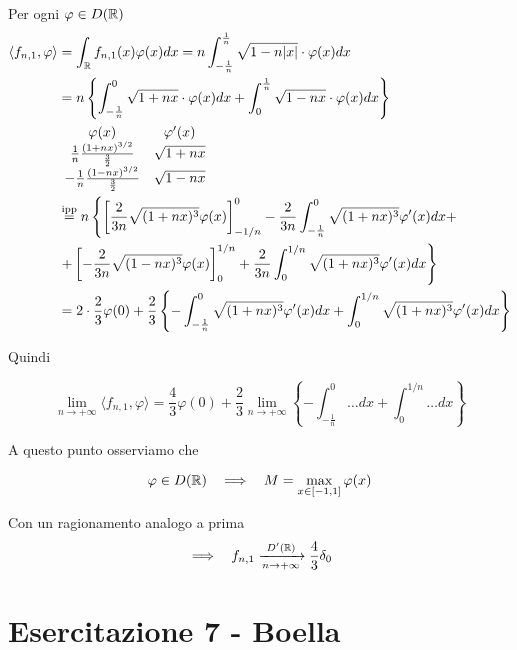 \begin{enumerate}
Per ogni $\varphi \in D(\mathbb{R})$
\begin{align*}
\langle f_{n, 1}, \varphi \rangle & = \int_{\mathbb{R}} f_{n, 1}(x) \varphi (x) dx = n\int^{\frac{1}{n}}_{- \frac{1}{n}}\sqrt{1 - n| x|} \cdot \varphi (x) dx\\
 & = n\left\{\int^{0}_{- \frac{1}{n}}\sqrt{1 + nx} \cdot \varphi (x) dx + \int^{\frac{1}{n}}_{0}\sqrt{1 - nx} \cdot \varphi (x) dx\right\}\\
 &
\begin{array}{c c}
\varphi (x) & \varphi'(x)\\
\frac{1}{n}\frac{(1 + nx)^{3/2}}{\frac{3}{2}} & \sqrt{1 + nx}\\
- \frac{1}{n}\frac{(1 - nx)^{3/2}}{\frac{3}{2}} & \sqrt{1 - nx}
\end{array}\\
 & \overset{\text{ipp}}{=} n\left\{\left[\frac{2}{3n}\sqrt{(1 + nx)^{3}} \varphi (x)\right]^{0}_{- 1/n} - \frac{2}{3n}\int^{0}_{- \frac{1}{n}}\sqrt{(1 + nx)^{3}} \varphi'(x)dx + \right. \\
 & \left. + \left[ - \frac{2}{3n}\sqrt{(1 - nx)^{3}} \varphi (x)\right]^{1/n}_{0} + \frac{2}{3n}\int^{1/n}_{0}\sqrt{(1 + nx)^{3}} \varphi'(x)dx\right\}\\
 & = 2 \cdot \frac{2}{3} \varphi (0) + \frac{2}{3}\left\{- \int^{0}_{- \frac{1}{n}}\sqrt{(1 + nx)^{3}} \varphi'(x)dx + \int^{1/n}_{0}\sqrt{(1 + nx)^{3}} \varphi'(x)dx\right\}
\end{align*}

Quindi

\begin{equation*}
\lim\limits_{n\rightarrow + \infty} \langle f_{n, 1}, \varphi \rangle = \frac{4}{3} \varphi (0) + \frac{2}{3}\lim\limits_{n\rightarrow + \infty}\left\{- \int^{0}_{- \frac{1}{n}} \dotsc dx + \int^{1/n}_{0} \dotsc dx\right\}
\end{equation*}

A questo punto osserviamo che

\begin{equation*}
\varphi \in D(\mathbb{R}) \ \ \implies \ \ M = \max_{x\in [ - 1, 1]} \varphi (x)
\end{equation*}

Con un ragionamento analogo a prima
\begin{equation*}
\implies \ \ f_{n, 1}\xrightarrow[n\rightarrow + \infty ]{D'(\mathbb{R})}\frac{4}{3} \delta_{0}
\end{equation*}
\end{enumerate}
\chapter{Esercitazione 7 - Boella}

